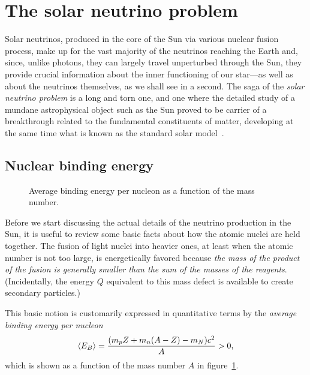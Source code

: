 \section{The solar neutrino problem}
\label{sec:solar_neutrino_problem}


Solar neutrinos, produced in the core of the Sun via various nuclear fusion process,
make up for the vast majority of the neutrinos reaching the Earth and, since, unlike
photons, they can largely travel unperturbed through the Sun, they provide crucial
information about the inner functioning of our star---as well as about the neutrinos
themselves, as we shall see in a second. The saga of the \emph{solar neutrino problem}
is a long and torn one, and one where the detailed study of a mundane astrophysical
object such as the Sun proved to be carrier of a breakthrough related to the fundamental
constituents of matter, developing at the same time what is known as the standard
solar model~\cite{2003nipb.conf...15B}.


\subsection{Nuclear binding energy}
\label{sec:nuclear_binding_energy}

\begin{figure}[!htbp]
  
  \caption{Average binding energy per nucleon as a function of the mass number.}
  \label{fig:nucleon_binding_energy}
\end{figure}

Before we start discussing the actual details of the neutrino production in the
Sun, it is useful to review some basic facts about how the atomic nuclei are
held together. The fusion of light nuclei into heavier ones, at least when the
atomic number is not too large, is energetically favored because \emph{the mass
of the product of the fusion is generally smaller than the sum of the masses of
the reagents}. (Incidentally, the energy $Q$ equivalent to this mass defect is
available to create secondary particles.)

This basic notion is customarily expressed in quantitative terms by
the \emph{average binding energy per nucleon}
\begin{align*}
  \left<E_B\right> = \frac{(m_p Z + m_n(A - Z) - m_N)c^2}{A} > 0,
\end{align*}
which is shown as a function of the mass number $A$ in
figure~\ref{fig:nucleon_binding_energy}.

